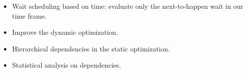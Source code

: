 \begin{itemize}
\item Wait scheduling based on time: evaluate only the next-to-happen wait in our time frame.
\item Improve the dynamic optimization.
\item Hierarchical dependencies in the static optimization.
\item Statistical analysis on dependencies.
\end{itemize}